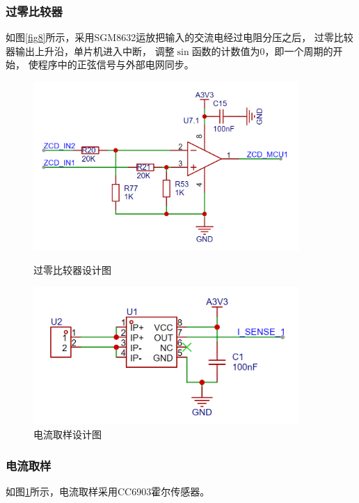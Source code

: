 \documentclass[a4paper,12pt]{article}
\begin{document}
\subsubsection{过零比较器}
如图\ref{fig8}所示，采用SGM8632运放把输入的交流电经过电阻分压之后，
过零比较器输出上升沿，单片机进入中断，
调整$\sin$函数的计数值为0，即一个周期的开始，
使程序中的正弦信号与外部电网同步。


\begin{figure}[htbp]
    \centering
    \begin{minipage}{0.45\textwidth}
        \centering
        \includegraphics[width=0.9\textwidth]{src/fig8.png}
        \caption{过零比较器设计图}
        \label{fig8}
    \end{minipage}
    \qquad
    \begin{minipage}{0.45\textwidth}
        \centering
        \includegraphics[width=0.9\textwidth]{src/fig11.png}
        \caption{电流取样设计图}
        \label{fig11}
    \end{minipage}
\end{figure}
\subsubsection{电流取样}
如图\ref{fig11}所示，电流取样采用CC6903霍尔传感器。
\end{document}
